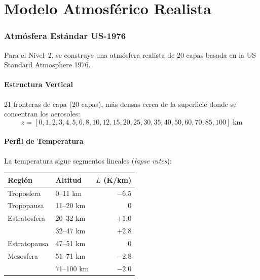 \documentclass[a4paper,11pt]{article}
\begin{document}
\part{Modelo Atmosf\'erico Realista}

\section{Atm\'osfera Est\'andar US-1976}\label{sec:us76}

Para el Nivel~2, se construye una atm\'osfera realista de 20 capas basada en la
US Standard Atmosphere 1976.

\subsection{Estructura Vertical}

21 fronteras de capa (20 capas), m\'as densas cerca de la superficie donde
se concentran los aerosoles:
\begin{equation}
    z = [0, 1, 2, 3, 4, 5, 6, 8, 10, 12, 15, 20, 25, 30, 35, 40, 50, 60, 70, 85, 100]\;\text{km}
\end{equation}

\subsection{Perfil de Temperatura}

La temperatura sigue segmentos lineales (\emph{lapse rates}):
\begin{center}
\begin{tabular}{llr}
\toprule
\textbf{Regi\'on} & \textbf{Altitud} & \textbf{$L$ (K/km)} \\ \midrule
Troposfera      & 0--11 km   & $-6.5$ \\
Tropopausa      & 11--20 km  & $0$ \\
Estratosfera    & 20--32 km  & $+1.0$ \\
                & 32--47 km  & $+2.8$ \\
Estratopausa    & 47--51 km  & $0$ \\
Mesosfera       & 51--71 km  & $-2.8$ \\
                & 71--100 km & $-2.0$ \\
\bottomrule
\end{tabular}
\end{center}
\end{document}
